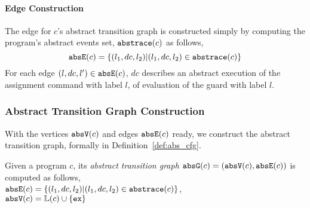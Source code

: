   \paragraph{Edge Construction}
The edge for $c$'s abstract transition graph is constructed simply by computing the program's abstract events set, $\mathtt{abs}{\mathtt{trace}}(c)$ as follows,
  \[
    \mathtt{abs}{\mathtt{E}}(c) = \{(l_1, dc, l_2) | (l_1, dc, l_2) \in \mathtt{abs}{\mathtt{trace}}(c)\}
  \]
  For each edge $(l, dc, l') \in \mathtt{abs}{\mathtt{E}}(c)$, $dc$ describes an abstract execution of the assignment command with label $l$,
  of evaluation of the guard with label $l$.
%
\subsubsection{Abstract Transition Graph Construction} 
With the vertices $\mathtt{abs}{\mathtt{V}}(c)$ and edges $\mathtt{abs}{\mathtt{E}}(c)$ ready, we construct the abstract transition graph, formally in
Definition~\ref{def:abs_cfg}.
%
\begin{defn}
\label{def:abs_cfg}
Given a program $c$, 
its \emph{abstract transition graph} $\mathtt{abs}{\mathtt{G}}(c) =(\mathtt{abs}{\mathtt{V}}(c), \mathtt{abs}{\mathtt{E}}(c))$ is computed as follows,
\\
$\mathtt{abs}{\mathtt{E}}(c) = \{(l_1, dc, l_2) | (l_1, dc, l_2) \in \mathtt{abs}{\mathtt{trace}}(c)\}$,
\\
$\mathtt{abs}{\mathtt{V}}(c) = \mathbb{L}(c)\cup\{\mathtt{ex}\}$
\end{defn}
%
